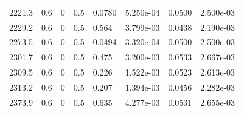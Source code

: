 \documentclass[preview]{standalone}
\begin{document}
{{{\begin{tabular}{L{1.2cm}C{1.2cm} C{0.3cm}C{0.5cm} C{1.4cm}C{1.4cm} C{1.4cm}C{1.4cm}}
  2221.3  &   0.6  & 0     & 0.5 &  0.0780  & 5.250e-04  & 0.0500 &  2.500e-03   \\ 
  2229.2  &   0.6  & 0     & 0.5 &  0.564  & 3.799e-03  & 0.0438 &  2.190e-03   \\ 
  2273.5  &   0.6  & 0     & 0.5 &  0.0494  & 3.320e-04  & 0.0500 &  2.500e-03   \\ 
  2301.7  &   0.6  & 0     & 0.5 &  0.475  & 3.200e-03  & 0.0533 &  2.667e-03   \\ 
  2309.5  &   0.6  & 0     & 0.5 &  0.226  & 1.522e-03  & 0.0523 &  2.613e-03   \\ 
  2313.2  &   0.6  & 0     & 0.5 &  0.207  & 1.394e-03  & 0.0456 &  2.282e-03   \\ 
  2373.9  &   0.6  & 0     & 0.5 &  0.635  & 4.277e-03  & 0.0531 &  2.655e-03   \\ 
\hline 
\end{tabular} 

}}}
\end{document}
